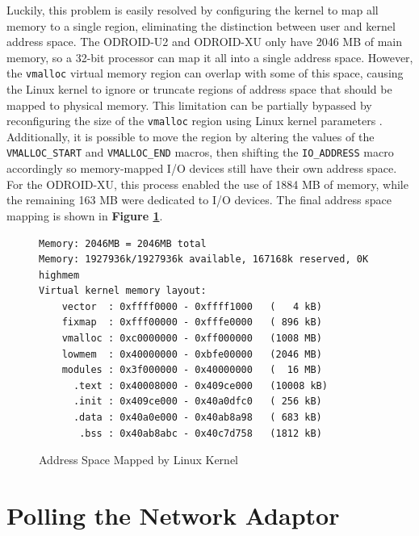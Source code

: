 \documentclass[11pt]{book}
\begin{document}
Luckily, this problem is easily resolved by configuring the kernel to map all
memory to a single region, eliminating the distinction between user and kernel
address space. The ODROID-U2 and ODROID-XU only have 2046 MB of main memory, so
a 32-bit processor can map it all into a single address space. However, the
\verb;vmalloc; virtual memory region can overlap with some of this space,
causing the Linux kernel to ignore or truncate regions of address space that
should be mapped to physical memory. This limitation can be partially bypassed
by reconfiguring the size of the \verb;vmalloc; region using Linux kernel
parameters \cite{vmalloc-overlap}. Additionally, it is possible to move the
region by altering the values of the \verb;VMALLOC_START; and \verb;VMALLOC_END;
macros, then shifting the \verb;IO_ADDRESS; macro accordingly so memory-mapped
I/O devices still have their own address space. For the ODROID-XU, this process
enabled the use of 1884 MB of memory, while the remaining 163 MB were dedicated
to I/O devices. The final address space mapping is shown in \textbf{Figure
  \ref{addrmap}}.


\begin{figure}[h]
\begin{center}
\begin{verbatim}
Memory: 2046MB = 2046MB total
Memory: 1927936k/1927936k available, 167168k reserved, 0K highmem
Virtual kernel memory layout:
    vector  : 0xffff0000 - 0xffff1000   (   4 kB)
    fixmap  : 0xfff00000 - 0xfffe0000   ( 896 kB)
    vmalloc : 0xc0000000 - 0xff000000   (1008 MB)
    lowmem  : 0x40000000 - 0xbfe00000   (2046 MB)
    modules : 0x3f000000 - 0x40000000   (  16 MB)
      .text : 0x40008000 - 0x409ce000   (10008 kB)
      .init : 0x409ce000 - 0x40a0dfc0   ( 256 kB)
      .data : 0x40a0e000 - 0x40ab8a98   ( 683 kB)
       .bss : 0x40ab8abc - 0x40c7d758   (1812 kB)
\end{verbatim}
\end{center}
\caption{Address Space Mapped by Linux Kernel}
\label{addrmap}
\end{figure}

\section{\textbf{Polling the Network Adaptor}}
\end{document}
